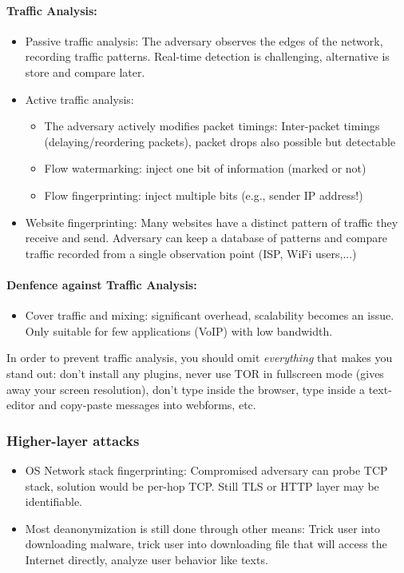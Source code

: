 \paragraph{Traffic Analysis:}
\begin{itemize}
	\item Passive traffic analysis: The adversary observes the edges of the network, recording traffic patterns. Real-time detection is challenging, alternative is store and compare later.
	\item Active traffic analysis: 
	\begin{itemize}
		\item The adversary actively modifies packet timings: Inter-packet timings (delaying/reordering packets), packet drops also possible but detectable
		\item Flow watermarking: inject one bit of information (marked or not)
		\item Flow fingerprinting: inject multiple bits (e.g., sender IP address!)
	\end{itemize}
	\item Website fingerprinting: Many websites have a distinct pattern of traffic they receive and send. Adversary can keep a database of patterns and compare traffic recorded from a single observation point (ISP, WiFi users,...)
\end{itemize}

\paragraph{Denfence against Traffic Analysis:}
\begin{itemize}
    \item Cover traffic and mixing: significant overhead, scalability becomes an issue. Only suitable for few applications (VoIP) with low bandwidth.
\end{itemize}

In order to prevent traffic analysis, you should omit \textit{everything} that makes you stand out: don't install any plugins, never use TOR in fullscreen mode (gives away your screen resolution), don't type inside the browser, type inside a text-editor and copy-paste messages into webforms, etc.

\subsubsection{Higher-layer attacks}
\begin{itemize}
	\item OS Network stack fingerprinting: Compromised adversary can probe TCP stack, solution would be per-hop TCP. Still TLS or HTTP layer may be identifiable.
	\item Most deanonymization is still done through other means: Trick user into downloading malware, trick user into downloading file that will access the Internet directly, analyze user behavior like texts.
\end{itemize}

